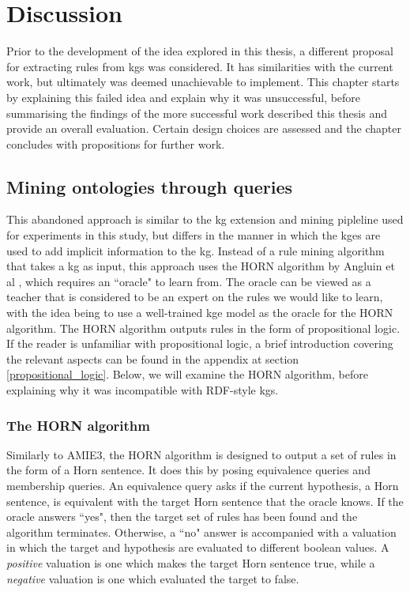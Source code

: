\chapter{Discussion}
Prior to the development of the idea explored in this thesis, a different proposal for extracting rules from \glspl{kg} was considered. It has similarities with the current work, but ultimately was deemed unachievable to implement. This chapter starts by explaining this failed idea and explain why it was unsuccessful, before summarising the findings of the more successful work described this thesis and provide an overall evaluation. Certain design choices are assessed and the chapter concludes with propositions for further work.

\section{Mining ontologies through queries}
This abandoned approach is similar to the \gls{kg} extension and mining pipleline used for experiments in this study, but differs in the manner in which the \glspl{kge} are used to add implicit information to the \gls{kg}. Instead of a rule mining algorithm that takes a \gls{kg} as input, this approach uses the HORN algorithm by Angluin et al \cite{DBLP:journals/ml/AngluinFP92}, which requires an ``oracle" to learn from. The oracle can be viewed as a teacher that is considered to be an expert on the rules we would like to learn, with the idea being to use a well-trained \gls{kge} model as the oracle for the HORN algorithm. The HORN algorithm outputs rules in the form of propositional logic. If the reader is unfamiliar with propositional logic, a brief introduction covering the relevant aspects can be found in the appendix at section \ref{propositional_logic}. Below, we will examine the HORN algorithm, before explaining why it was incompatible with RDF-style \glspl{kg}.

\subsection{The HORN algorithm}
Similarly to AMIE3, the HORN algorithm is designed to output a set of rules in the form of a Horn sentence. It does this by posing equivalence queries and membership queries. An equivalence query asks if the current hypothesis, a Horn sentence, is equivalent with the target Horn sentence that the oracle knows. If the oracle answers ``yes", then the target set of rules has been found and the algorithm terminates. Otherwise, a ``no" answer is accompanied with a valuation in which the target and hypothesis are evaluated to different boolean values. A \textit{positive} valuation is one which makes the target Horn sentence true, while a \textit{negative} valuation is one which evaluated the target to false. %

